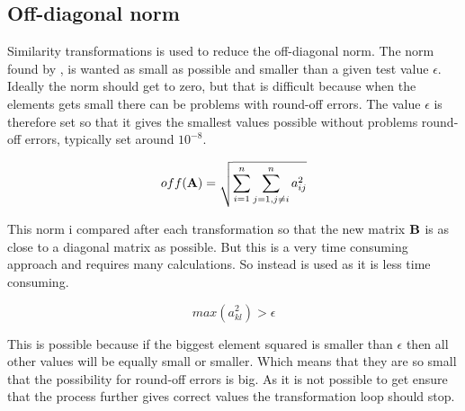 

\subsection*{Off-diagonal norm}

Similarity transformations is used to reduce the off-diagonal norm. The norm found by , is wanted as small as possible and smaller than a given test value $\epsilon $. Ideally the norm should get to zero, but that is difficult because when the elements gets small there can be problems with round-off errors. The value $\epsilon $ is therefore set so that it gives the smallest values possible without problems round-off errors, typically set around $10^{-8}$.  

\begin{equation}
	off(\mbox{\textbf{A}}) = \sqrt{\sum_{i=1}^n\sum_{j=1,j \ne i}^n a_{ij}^2}
	\label{eq:normA}
\end{equation} 


This norm i compared after each transformation so that the new matrix $\mbox{\textbf{B}}$ is as close to a diagonal matrix as possible. But this is a very time consuming approach and requires many calculations. So instead  is used as it is less time consuming. 

\begin{equation}
	max(a_{kl}^2) > \epsilon
	\label{eq:maxa}
\end{equation}

This is possible because if the biggest element squared is smaller than $\epsilon$ then all other values will be equally small or smaller. Which means that they are so small that the possibility for round-off errors is big. As it is not possible to get ensure that the process further gives correct values the transformation loop should stop. 







